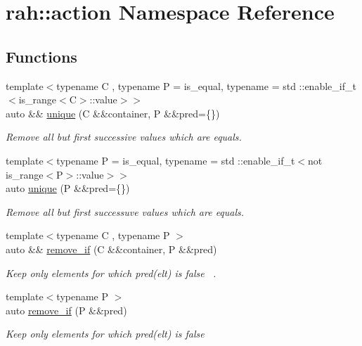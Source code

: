 \hypertarget{namespacerah_1_1action}{}\section{rah\+::action Namespace Reference}
\label{namespacerah_1_1action}
\subsection*{Functions}
\begin{DoxyCompactItemize}
\item 
{\footnotesize template$<$typename C , typename P  = is\+\_\+equal, typename  = std \+::enable\+\_\+if\+\_\+t$<$is\+\_\+range$<$\+C$>$\+::value$>$$>$ }\\auto \&\& \mbox{\hyperlink{namespacerah_1_1action_aea663eead5f5aa262ef890d7393daad6}{unique}} (C \&\&container, P \&\&pred=\{\})
\begin{DoxyCompactList}\small\item\em Remove all but first successive values which are equals. \end{DoxyCompactList}\item 
{\footnotesize template$<$typename P  = is\+\_\+equal, typename  = std \+::enable\+\_\+if\+\_\+t$<$not is\+\_\+range$<$\+P$>$\+::value$>$$>$ }\\auto \mbox{\hyperlink{namespacerah_1_1action_a2b3773f4b775a1e64307307556af24cd}{unique}} (P \&\&pred=\{\})
\begin{DoxyCompactList}\small\item\em Remove all but first successuve values which are equals. \end{DoxyCompactList}\item 
{\footnotesize template$<$typename C , typename P $>$ }\\auto \&\& \mbox{\hyperlink{namespacerah_1_1action_a759ca023dec90e65e7d0e0327ae11af7}{remove\+\_\+if}} (C \&\&container, P \&\&pred)
\begin{DoxyCompactList}\small\item\em Keep only elements for which pred(elt) is false~\newline
. \end{DoxyCompactList}\item 
{\footnotesize template$<$typename P $>$ }\\auto \mbox{\hyperlink{namespacerah_1_1action_a708ce68c6ed2b20ef9c0cdb6b697c980}{remove\+\_\+if}} (P \&\&pred)
\begin{DoxyCompactList}\small\item\em Keep only elements for which pred(elt) is false~\newline

\end{DoxyCompactList}
\end{DoxyCompactItemize}
